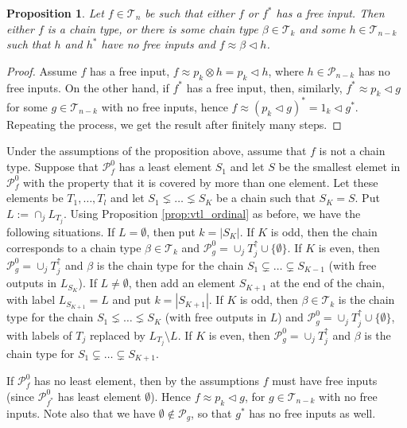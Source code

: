 \documentclass[12pt]{article}
\newtheorem{prop}{Proposition}
\theoremstyle{definition}
\theoremstyle{remark}
\def\Te{\mathcal T}
\def\Pe{\mathcal P}
\def\vtl{\vartriangleleft}
\begin{document}
\begin{prop}\label{prop:pf0_smallest} Let $f\in \Te_n$ be such that either $f$ or
$f^*$ has a free input. 
Then either $f$ is a chain type, or there is some chain type $\beta\in
\Te_k$ and some $h\in \Te_{n-k}$ such that $h$ and $h^*$ have no free inputs and
$f\approx \beta\vtl
h$. 

\end{prop}


\begin{proof} Assume $f$ has a free input, $f\approx p_k\otimes
h=p_k\vtl h$,
where  $h\in \Pe_{n-k}$ has no free inputs. On the other hand, if $f^*$ has a
free input, then, similarly, $f^*\approx p_k\vtl g$ for some $g\in \Te_{n-k}$ with no free
inputs, hence $f\approx (p_k\vtl g)^*=1_k\vtl g^*$. Repeating the process, we get the result
after finitely many steps.


\end{proof}

Under the assumptions of the proposition above, assume that $f$ is not a chain type. 
Suppose that $\Pe_f^0$ has a least element $S_1$ and let $S$ be the smallest elemet in
$\Pe_f^0$ with the property that it is covered by more than one element. Let these
elements be $T_1,\dots, T_l$ and let  $S_1\lneq \dots \lneq S_K$ be a chain such that $S_K=S$.
Put $L:=\cap_j L_{T_j}$. 
Using
Proposition \ref{prop:vtl_ordinal} as before, we have the following situations. If  $L=\emptyset$, then put  $k=|S_K|$. 
If $K$ is odd, then the chain corresponds to a chain type
$\beta\in \Te_{k}$ and $\Pe_g^0=\cup_j T_j^{\uparrow}\cup\{\emptyset\}$. If $K$ is even, then $\Pe_g^0=\cup_j T_j^{\uparrow}$ and $\beta$
is the chain type for the chain $S_1\subsetneq \dots\subsetneq S_{K-1}$ (with free outputs
in $L_{S_K}$). If $L\ne \emptyset$, then add an element $S_{K+1}$ at the end of the chain, with label
$L_{S_{K+1}}=L$ and put $k=|S_{K+1}|$. If $K$ is odd, then $\beta\in \Te_k$ is the chain type for the chain
$S_1\lneq \dots \lneq S_K$ (with free outputs in $L$) and $\Pe_g^0=\cup_j
T_j^{\uparrow}\cup \{\emptyset\}$, with labels of $T_j$ replaced by $L_{T_j}\setminus L$.  If
$K$ is even, then $\Pe_g^0=\cup_j T_j^{\uparrow}$ and $\beta$ is the chain type  for
$S_1\subsetneq\dots\subsetneq S_{K+1}$.

If $\Pe_f^0$ has no least element, then by the assumptions $f$ must have free inputs (since $\Pe_{f^*}^0$
has least element $\emptyset$). Hence  $f\approx p_k\vtl g$, for $g\in \Te_{n-k}$ with no
free inputs. Note also that we have  $\emptyset
\notin \Pe_g$, so that $g^*$ has no free inputs as well. 
\end{document}
